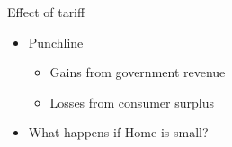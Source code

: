 \documentclass{beamer}
\begin{document}


\begin{frame}{Effect of tariff}

    \begin{itemize}
        \item Punchline
        \begin{itemize}
            \item Gains from government revenue
            \item Losses from consumer surplus
        \end{itemize}
        \item What happens if Home is small?
    \end{itemize}

\end{frame}
\end{document}
